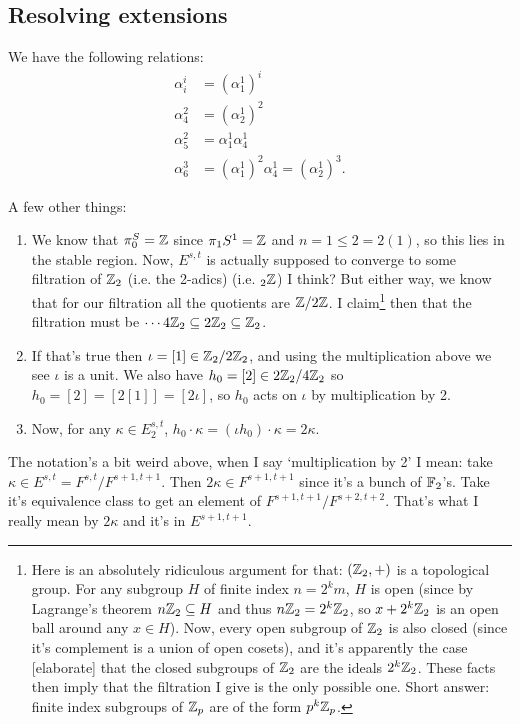 \documentclass{MetricNotes2023}
\def\bb{\ensuremath\mathbb}
\def\subq{\ensuremath\subseteq}
\def\inte{\ensuremath\mathbb{Z}}
\begin{document}
\subsection{Resolving extensions}


\begin{proposition}
We have the following relations:
\begin{align*}
\alpha^i_i &= (\alpha_1^1)^i\\
\alpha_4^2&=(\alpha^1_2)^2\\
\alpha^2_5&=\alpha^1_1 \alpha^1_4\\
\alpha^3_6&=(\alpha^1_1)^2 \alpha_4^1=(\alpha^1_2)^3.
\end{align*}
\end{proposition}

A few other things:
\begin{enumerate}
\item We know that \(\pi_0^S=\inte\) since \(\pi_1S^1=\inte\) and \(n=1\leq 2=2(1)\), so this lies in the stable region. Now, \(E^{s,t}\) is actually supposed to converge to some filtration of \(\inte_2\) (i.e. the 2-adics) (i.e. \(\text{}_2\inte\)) I think? But either way, we know that for our filtration all the quotients are \(\inte/2\inte\). I claim\footnote{Here is an absolutely ridiculous argument for that: \((\inte_2, +)\) is a topological group. For any subgroup \(H\) of finite index \(n=2^km\), \(H\) is open (since by Lagrange's theorem \(n\inte_2\subq H\) and thus \(n\inte_2=2^k\inte_2\), so \(x+2^k\inte_2\) is an open ball around any \(x\in H\)). Now, every open subgroup of \(\inte_2\) is also closed (since it's complement is a union of open cosets), and it's apparently the case [elaborate] that the closed subgroups of \(\inte_2\) are the ideals \(2^k\inte_2\). These facts then imply that the filtration I give is the only possible one. Short answer: finite index subgroups of \(\inte_p\) are of the form \(p^k\inte_p\).} then that the filtration must be \(\cdots 4\inte_2 \subq 2\inte_2 \subq \inte_2\). 
\item If that's true then \(\iota=[1]\in \inte_2/2\inte_2\), and using the multiplication above we see \(\iota\) is a unit. We also have \(h_0=[2]\in 2\inte_2/4\inte_2\) so \(h_0=[2]=[2[1]]=[2\iota]\), so \(h_0\) acts on \(\iota\) by multiplication by 2.
\item Now, for any \(\kappa\in E^{s,t}_2\), \(h_0\cdot \kappa = (\iota h_0)\cdot \kappa=2\kappa\). 
\end{enumerate}
The notation's a bit weird above, when I say `multiplication by 2' I mean: take \(\kappa \in E^{s,t}=F^{s,t}/F^{s+1,t+1}\). Then \(2\kappa \in F^{s+1,t+1}\) since it's a bunch of \(\bb{F}_2\)'s. Take it's equivalence class to get an element of \(F^{s+1, t+1}/F^{s+2,t+2}\). That's what I really mean by \(2\kappa\) and it's in \(E^{s+1,t+1}\).
\end{document}
